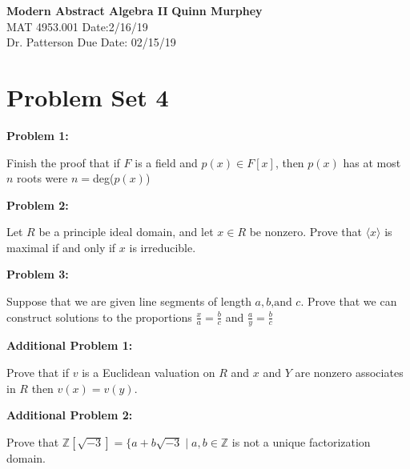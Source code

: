 \documentclass[letter, 12pt]{article}
\begin{document}
\noindent
\large\textbf{Modern Abstract Algebra II} \hfill \textbf{Quinn Murphey} \\
\normalsize MAT 4953.001 \hfill Date:2/16/19 \\
Dr. Patterson \hfill Due Date: 02/15/19 \\
\noindent\makebox[\linewidth]{\rule{\paperwidth}{0.4pt}}

\section*{Problem Set 4}
\doublespacing
\textbf{Problem 1:}
    
    Finish the proof that if $F$ is a field and $p(x)\in F[x]$, then $p(x)$ has at most $n$ roots were $n=$deg($p(x)$)
    
    
    
\noindent\textbf{Problem 2:}
    
    Let $R$ be a principle ideal domain, and let $x\in R$ be nonzero. Prove that $\langle x\rangle$ is maximal if and only if $x$ is irreducible.
    
    
    
\noindent\textbf{Problem 3:}
    
    Suppose that we are given line segments of length $a,b\text{,and }c$. Prove that we can construct solutions to the proportions $\frac{x}{a}=\frac{b}{c}$ and $\frac{a}{y}=\frac{b}{c}$
    
    
    
\noindent\textbf{Additional Problem 1:}
    
    Prove that if $v$ is a Euclidean valuation on $R$ and $x$ and $Y$ are nonzero associates in $R$ then $v(x)=v(y)$.
    
    
    
\noindent\textbf{Additional Problem 2:}
    
    Prove that $\mathbb{Z}[\sqrt{-3}]=\{a+b\sqrt{-3}\mid a,b\in\mathbb{Z}$ is not a unique factorization domain.
    
    
    
\end{document}
